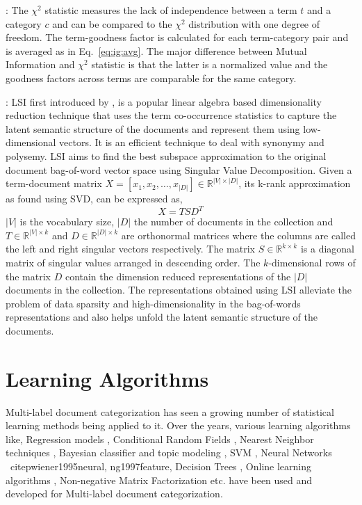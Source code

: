  : The $\chi^{2}$ statistic measures the lack of independence between a term $t$ and a category $c$ and can be compared to the $\chi^{2}$ distribution with one degree of freedom. The term-goodness factor is calculated for each term-category pair and is averaged as in Eq.~\ref{eq:ig:avg}. The major difference between Mutual Information and $\chi^{2}$ statistic is that the latter is a normalized value and the goodness factors across terms are comparable for the same category.

 : LSI first introduced by \citet{deerwester1990indexing}, is a popular linear algebra based dimensionality reduction technique that uses the term co-occurrence statistics to capture the latent semantic structure of the documents and represent them using low-dimensional vectors. It is an efficient technique to deal with synonymy and polysemy. LSI aims to find the best subspace approximation to the original document bag-of-word vector space using Singular Value Decomposition. Given a term-document matrix $X = \left[ x_{1}, x_{2}, \ldots, x_{|D|} \right] \in \mathbb{R}^{|V| \times |D|}$, its k-rank approximation as found using SVD, can be expressed as, 
\begin{equation}
X = T S D^{T}
\end{equation}
$|V|$ is the vocabulary size, $|D|$ the number of documents 
in the collection and $T \in \mathbb{R}^{|V| \times k}$ and $D \in \mathbb{R}^{|D| \times k}$ are orthonormal matrices where the columns are called the left and right singular vectors respectively. The matrix $S \in \mathbb{R}^{k \times k}$ is a diagonal matrix of singular values arranged in descending order. The $k$-dimensional rows of the matrix $D$ contain the dimension reduced representations of the $|D|$ documents in the collection. The representations obtained using LSI alleviate the problem of data sparsity and high-dimensionality in the bag-of-words representations and also helps unfold the latent semantic structure of the documents.

\section{Learning Algorithms}
\label{sec:lalgos}
Multi-label document categorization has seen a growing number of 
statistical learning methods being applied to it. Over the years, 
various learning algorithms like, Regression models 
\citep{cooper1994full, fuhr1991air}, Conditional Random Fields 
\citep{ghamrawi2005collective}, Nearest Neighbor techniques \citep{
yang1994expert, zhang2005k, zhang2007ml}, Bayesian classifier and topic modeling \citep{lewis1994comparison, mccallum1999multi, nigam2000text, rubin2012statistical, nigam1999using, ueda2002parametric}, 
SVM \citep{joachims1998text, elisseeff2001kernel}, Neural Networks \
citep{wiener1995neural, ng1997feature}, Decision Trees 
\citep{tong1994machine}, Online learning algorithms 
\citep{lewis1996training, crammer2002new}, Non-negative Matrix 
Factorization \citep{liu2006semi} etc. have been used and developed 
for Multi-label document categorization.

